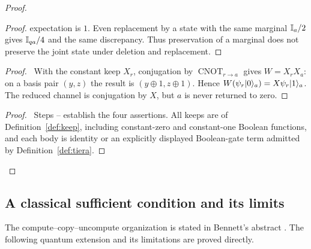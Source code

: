 \begin{proof}
\begin{proof}
 expectation is $1$. Even replacement by a state with the same
 marginal $\mathbb{I}_a/2$ gives $\mathbb{I}_{qa}/4$ and the same discrepancy.
 Thus preservation of a marginal does not preserve the joint state
 under deletion and replacement.
 \end{proof}
 \begin{proof}\pf\ With the constant keep $X_r$, conjugation by
 $\operatorname{CNOT}_{r\to a}$ gives $W=X_rX_a$: on a basis pair
 $(y,z)$ the result is $(y\oplus1,z\oplus1)$. Hence
 $W(\psi_r\lvert 0\rangle_a)=X\psi_r\lvert 1\rangle_a$. The reduced channel is
 conjugation by $X$, but $a$ is never returned to zero.
 \end{proof}
 \qedstep
 \begin{proof}\pf\ Steps --
 establish the four assertions. All keeps are of
 Definition~\ref{def:keep}, including constant-zero and constant-one
 Boolean functions, and each body is identity or an explicitly
 displayed Boolean-gate term admitted by Definition~\ref{def:tiera}.
 \end{proof}
\end{proof}

\subsection{A classical sufficient condition and its limits}

The compute--copy--uncompute organization is stated in Bennett's abstract
\cite[abstract, journal p.~525, PDF p.~1]{Bennett1973}.
The following quantum extension and its limitations are proved directly.

